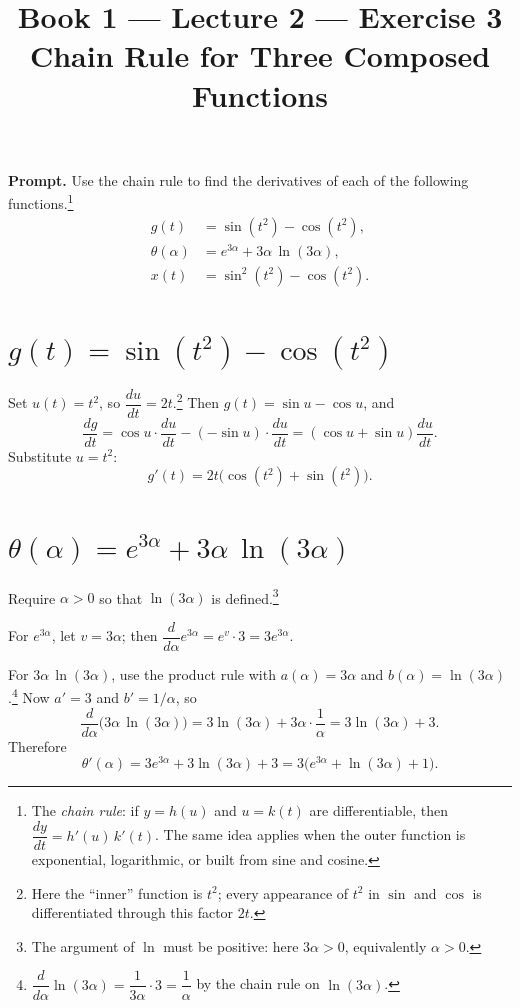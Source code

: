 \documentclass[11pt]{article}
\title{\textbf{Book 1 --- Lecture 2 --- Exercise 3}\\[2mm]
\large Chain Rule for Three Composed Functions}
\author{}
\date{}
\newcommand{\promptbox}[1]{%
  \begin{savenotes}%
  \begingroup\setlength{\fboxsep}{10pt}\noindent
  \colorbox{blue!8}{\parbox{\dimexpr\linewidth-2\fboxsep\relax}{\textbf{Prompt. }#1}}
  \endgroup
  \end{savenotes}%
}
\begin{document}
\maketitle

\promptbox{Use the chain rule to find the derivatives of each of the following
functions.\footnote{The \emph{chain rule}: if \(y=h(u)\) and \(u=k(t)\) are
differentiable, then \(\dfrac{dy}{dt}=h'(u)\,k'(t)\). The same idea applies when
the outer function is exponential, logarithmic, or built from sine and cosine.}
\[
\begin{aligned}
g(t) &= \sin(t^2) - \cos(t^2), \\
\theta(\alpha) &= e^{3\alpha} + 3\alpha\,\ln(3\alpha), \\
x(t) &= \sin^2(t^2) - \cos(t^2).
\end{aligned}
\]
}

\section*{\(g(t)=\sin(t^2)-\cos(t^2)\)}
Set \(u(t)=t^2\), so \(\dfrac{du}{dt}=2t\).\footnote{Here the ``inner'' function is
\(t^2\); every appearance of \(t^2\) in \(\sin\) and \(\cos\) is differentiated
through this factor \(2t\).} Then \(g(t)=\sin u-\cos u\), and
\[
\frac{dg}{dt}=\cos u\cdot\frac{du}{dt}-(-\sin u)\cdot\frac{du}{dt}
=(\cos u+\sin u)\frac{du}{dt}.
\]
Substitute \(u=t^2\):
\[
g'(t)=2t\bigl(\cos(t^2)+\sin(t^2)\bigr).
\]

\section*{\(\theta(\alpha)=e^{3\alpha}+3\alpha\,\ln(3\alpha)\)}
Require \(\alpha>0\) so that \(\ln(3\alpha)\) is defined.\footnote{The argument of
\(\ln\) must be positive: here \(3\alpha>0\), equivalently \(\alpha>0\).}

For \(e^{3\alpha}\), let \(v=3\alpha\); then \(\dfrac{d}{d\alpha}e^{3\alpha}
= e^v\cdot 3 = 3e^{3\alpha}\).

For \(3\alpha\,\ln(3\alpha)\), use the product rule with \(a(\alpha)=3\alpha\) and
\(b(\alpha)=\ln(3\alpha)\).\footnote{\(\dfrac{d}{d\alpha}\ln(3\alpha)=\dfrac{1}{3\alpha}\cdot 3
=\dfrac{1}{\alpha}\) by the chain rule on \(\ln(3\alpha)\).}
Now \(a'=3\) and \(b'=1/\alpha\), so
\[
\frac{d}{d\alpha}\bigl(3\alpha\,\ln(3\alpha)\bigr)=3\ln(3\alpha)+3\alpha\cdot\frac{1}{\alpha}
=3\ln(3\alpha)+3.
\]
Therefore
\[
\theta'(\alpha)=3e^{3\alpha}+3\ln(3\alpha)+3
=3\bigl(e^{3\alpha}+\ln(3\alpha)+1\bigr).
\]
\end{document}
